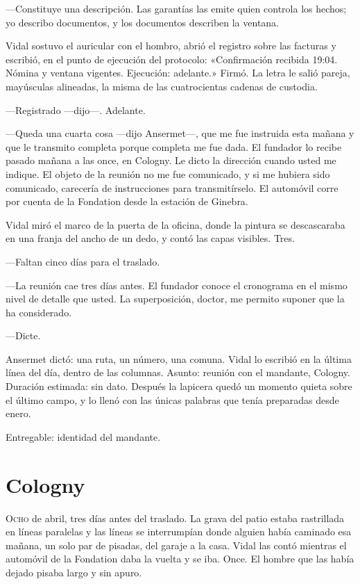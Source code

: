 ---Constituye una descripción. Las garantías las emite quien controla los hechos; yo describo documentos, y los documentos describen la ventana.

Vidal sostuvo el auricular con el hombro, abrió el registro sobre las facturas y escribió, en el punto de ejecución del protocolo: «Confirmación recibida 19:04. Nómina y ventana vigentes. Ejecución: adelante.» Firmó. La letra le salió pareja, mayúsculas alineadas, la misma de las cuatrocientas cadenas de custodia.

---Registrado ---dijo---. Adelante.

---Queda una cuarta cosa ---dijo Ansermet---, que me fue instruida esta mañana y que le transmito completa porque completa me fue dada. El fundador lo recibe pasado mañana a las once, en Cologny. Le dicto la dirección cuando usted me indique. El objeto de la reunión no me fue comunicado, y si me hubiera sido comunicado, carecería de instrucciones para transmitírselo. El automóvil corre por cuenta de la Fondation desde la estación de Ginebra.

Vidal miró el marco de la puerta de la oficina, donde la pintura se descascaraba en una franja del ancho de un dedo, y contó las capas visibles. Tres.

---Faltan cinco días para el traslado.

---La reunión cae tres días antes. El fundador conoce el cronograma en el mismo nivel de detalle que usted. La superposición, doctor, me permito suponer que la ha considerado.

---Dicte.

Ansermet dictó: una ruta, un número, una comuna. Vidal lo escribió en la última línea del día, dentro de las columnas. Asunto: reunión con el mandante, Cologny. Duración estimada: sin dato. Después la lapicera quedó un momento quieta sobre el último campo, y lo llenó con las únicas palabras que tenía preparadas desde enero.

Entregable: identidad del mandante.

\clearpage

\chapter{Cologny}

\lettrine[lines=2, lhang=0.1, nindent=0.2em]{O}{cho} de abril, tres días antes del traslado. La grava del patio estaba rastrillada en líneas paralelas y las líneas se interrumpían donde alguien había caminado esa mañana, un solo par de pisadas, del garaje a la casa. Vidal las contó mientras el automóvil de la Fondation daba la vuelta y se iba. Once. El hombre que las había dejado pisaba largo y sin apuro.


